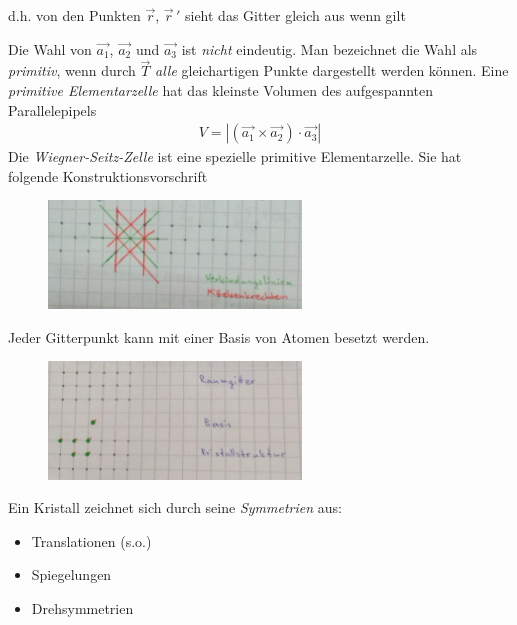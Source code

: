 \documentclass[paper=A4,12pt,pagesize,twoside,BCOR=8mm,ngerman]{scrartcl}
\newcommand{\abs}[1]{\left| #1 \right|} %
\begin{document}
			d.h. von den Punkten $\vec{r}$, $\vec{r}\, '$ sieht das 
			Gitter gleich aus wenn gilt
			\begin{center}
			\end{center}		
			Die Wahl von $\vec{a_1}$, $\vec{a_2}$ und $\vec{a_3}$ ist 
			\emph{nicht} eindeutig. Man bezeichnet die Wahl als 
			\emph{primitiv}, wenn durch $\vec{T}$ \emph{alle} 
			gleichartigen Punkte dargestellt werden können.
			Eine \emph{primitive Elementarzelle} hat das kleinste 
			Volumen des aufgespannten Parallelepipels 
			\begin{align*}
				V=\abs{(\vec{a_1} \times \vec{a_2}) \cdot \vec{a_3}}
			\end{align*}
			Die \emph{Wiegner-Seitz-Zelle} ist eine spezielle primitive 
			Elementarzelle. Sie hat folgende Konstruktionsvorschrift
			\begin{figure}[H]
				\centering
				\includegraphics[width=0.6\textwidth]{pics/pic002.jpg}
			\end{figure}
			Jeder Gitterpunkt kann mit einer Basis von Atomen besetzt 
			werden.
			\begin{center}
			\end{center}
			\begin{figure}[H]
					\centering
					\includegraphics[width=0.6\textwidth]
					{pics/pic003.jpg}
			\end{figure}
				Ein Kristall zeichnet sich durch seine \emph{Symmetrien} 
				aus:
			\begin{itemize}
				\item Translationen (s.o.)
				\item Spiegelungen
				\item Drehsymmetrien
			\end{itemize}
\end{document}
